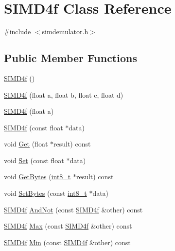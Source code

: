 \hypertarget{class_s_i_m_d4f}{}\section{S\+I\+M\+D4f Class Reference}
\label{class_s_i_m_d4f}


{\ttfamily \#include $<$simdemulator.\+h$>$}

\subsection*{Public Member Functions}
\begin{DoxyCompactItemize}
\item 
\hyperlink{class_s_i_m_d4f_abda4aa81a62d1573aba11dcd1e381864}{S\+I\+M\+D4f} ()
\item 
\hyperlink{class_s_i_m_d4f_a9997f26840dc7bfb7eeb818c9a87d367}{S\+I\+M\+D4f} (float a, float b, float c, float d)
\item 
\hyperlink{class_s_i_m_d4f_a10e3822b07aad4fb7988762107cd9234}{S\+I\+M\+D4f} (float a)
\item 
\hyperlink{class_s_i_m_d4f_a744835741d77ed146794c8d8d2b396f7}{S\+I\+M\+D4f} (const float $\ast$data)
\item 
void \hyperlink{class_s_i_m_d4f_a8cd99451df52ad40c4dfdd79a63364bd}{Get} (float $\ast$result) const 
\item 
void \hyperlink{class_s_i_m_d4f_aa023e7d4ac74e0f9a4aecd0795958583}{Set} (const float $\ast$data)
\item 
void \hyperlink{class_s_i_m_d4f_ab22b61011c8d8fa4007025018a97ef17}{Get\+Bytes} (\hyperlink{simddefines_8h_aef44329758059c91c76d334e8fc09700}{int8\+\_\+t} $\ast$result) const 
\item 
void \hyperlink{class_s_i_m_d4f_a4e6d88bddd43495f3c3fa94f4ae1f54c}{Set\+Bytes} (const \hyperlink{simddefines_8h_aef44329758059c91c76d334e8fc09700}{int8\+\_\+t} $\ast$data)
\item 
\hyperlink{class_s_i_m_d4f}{S\+I\+M\+D4f} \hyperlink{class_s_i_m_d4f_a08c9afbd07340f8f094c7337683fdc9f}{And\+Not} (const \hyperlink{class_s_i_m_d4f}{S\+I\+M\+D4f} \&other) const 
\item 
\hyperlink{class_s_i_m_d4f}{S\+I\+M\+D4f} \hyperlink{class_s_i_m_d4f_ac6e26ef1ca79d1e7c65e52899c2869cb}{Max} (const \hyperlink{class_s_i_m_d4f}{S\+I\+M\+D4f} \&other) const 
\item 
\hyperlink{class_s_i_m_d4f}{S\+I\+M\+D4f} \hyperlink{class_s_i_m_d4f_a939bad777bd0c1852d55dcb220b40f68}{Min} (const \hyperlink{class_s_i_m_d4f}{S\+I\+M\+D4f} \&other) const 

\end{DoxyCompactItemize}
